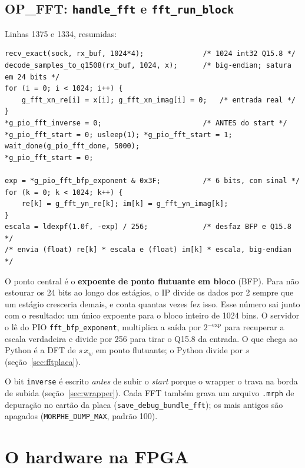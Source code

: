 \documentclass[11pt,a4paper,oneside]{article}
\begin{document}
\subsection{OP\_FFT: \texttt{handle\_fft} e \texttt{fft\_run\_block}}
\label{sec:fft-srv}

Linhas 1375 e 1334, resumidas:

\begin{lstlisting}[style=c]
recv_exact(sock, rx_buf, 1024*4);              /* 1024 int32 Q15.8 */
decode_samples_to_q1508(rx_buf, 1024, x);      /* big-endian; satura em 24 bits */
for (i = 0; i < 1024; i++) {
    g_fft_xn_re[i] = x[i]; g_fft_xn_imag[i] = 0;   /* entrada real */
}
*g_pio_fft_inverse = 0;                        /* ANTES do start */
*g_pio_fft_start = 0; usleep(1); *g_pio_fft_start = 1;
wait_done(g_pio_fft_done, 5000);
*g_pio_fft_start = 0;

exp = *g_pio_fft_bfp_exponent & 0x3F;          /* 6 bits, com sinal */
for (k = 0; k < 1024; k++) {
    re[k] = g_fft_yn_re[k]; im[k] = g_fft_yn_imag[k];
}
escala = ldexpf(1.0f, -exp) / 256;             /* desfaz BFP e Q15.8 */
/* envia (float) re[k] * escala e (float) im[k] * escala, big-endian */
\end{lstlisting}

O ponto central é o \textbf{expoente de ponto flutuante em bloco} (BFP). Para
não estourar os 24 bits ao longo dos estágios, o IP divide os dados por 2
sempre que um estágio cresceria demais, e conta quantas vezes fez isso. Esse
número sai junto com o resultado: um único expoente para o bloco inteiro de
1024 bins. O servidor o lê do PIO \texttt{fft\_bfp\_exponent}, multiplica a
saída por $2^{-\text{exp}}$ para recuperar a escala verdadeira e divide por 256
para tirar o Q15.8 da entrada. O que chega ao Python é a DFT de $s\,x_w$ em
ponto flutuante; o Python divide por $s$ (seção~\ref{sec:fftplaca}).

O bit \texttt{inverse} é escrito \emph{antes} de subir o \emph{start} porque o
wrapper o trava na borda de subida (seção~\ref{sec:wrapper}). Cada FFT também
grava um arquivo \texttt{.mrph} de depuração no cartão da placa
(\texttt{save\_debug\_bundle\_fft}); os mais antigos são apagados
(\texttt{MORPHE\_DUMP\_MAX}, padrão 100).

\section{O hardware na FPGA}
\label{sec:fpga}
\end{document}
